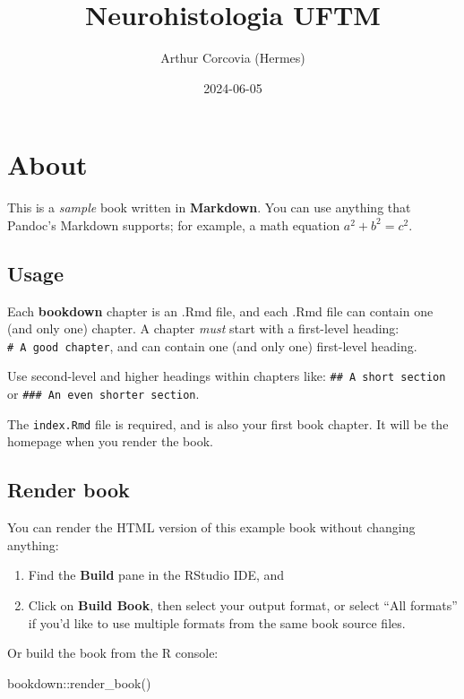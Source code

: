 \documentclass[
]{book}
\title{Neurohistologia UFTM}
\author{Arthur Corcovia (Hermes)}
\date{2024-06-05}
\newenvironment{Shaded}{\begin{snugshade}}{\end{snugshade}}
\newcommand{\FunctionTok}[1]{\textcolor[rgb]{0.00,0.00,0.00}{#1}}
\newcommand{\NormalTok}[1]{#1}
\newcommand{\SpecialCharTok}[1]{\textcolor[rgb]{0.00,0.00,0.00}{#1}}
\theoremstyle{definition}
\theoremstyle{definition}
\theoremstyle{definition}
\theoremstyle{definition}
\theoremstyle{remark}
\begin{document}
\maketitle

{
\setcounter{tocdepth}{1}
\tableofcontents
}
\hypertarget{about}{%
\chapter{About}\label{about}}

This is a \emph{sample} book written in \textbf{Markdown}. You can use anything that Pandoc's Markdown supports; for example, a math equation \(a^2 + b^2 = c^2\).

\hypertarget{usage}{%
\section{Usage}\label{usage}}

Each \textbf{bookdown} chapter is an .Rmd file, and each .Rmd file can contain one (and only one) chapter. A chapter \emph{must} start with a first-level heading: \texttt{\#\ A\ good\ chapter}, and can contain one (and only one) first-level heading.

Use second-level and higher headings within chapters like: \texttt{\#\#\ A\ short\ section} or \texttt{\#\#\#\ An\ even\ shorter\ section}.

The \texttt{index.Rmd} file is required, and is also your first book chapter. It will be the homepage when you render the book.

\hypertarget{render-book}{%
\section{Render book}\label{render-book}}

You can render the HTML version of this example book without changing anything:

\begin{enumerate}
\def\labelenumi{\arabic{enumi}.}
\item
  Find the \textbf{Build} pane in the RStudio IDE, and
\item
  Click on \textbf{Build Book}, then select your output format, or select ``All formats'' if you'd like to use multiple formats from the same book source files.
\end{enumerate}

Or build the book from the R console:

\begin{Shaded}
\begin{Highlighting}[]
\NormalTok{bookdown}\SpecialCharTok{::}\FunctionTok{render\_book}\NormalTok{()}
\end{Highlighting}
\end{Shaded}
\end{document}
